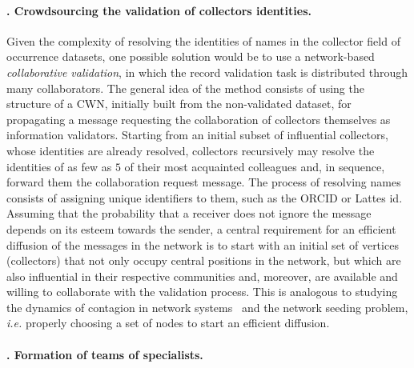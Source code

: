 \paragraph*{\theApplicationCase. Crowdsourcing the validation of collectors identities.}
Given the complexity of resolving the identities of names in the collector field of occurrence datasets, one possible solution would be to use a network-based \textit{collaborative validation}, in which the record validation task is distributed through many collaborators.
The general idea of the method consists of using the structure of a CWN, initially built from the non-validated dataset, for propagating a message requesting the collaboration of collectors themselves as information validators.
Starting from an initial subset of influential collectors, whose identities are already resolved, collectors recursively may resolve the identities of as few as $5$ of their most acquainted colleagues and, in sequence, forward them the collaboration request message. %
The process of resolving names consists of assigning unique identifiers to them, such as the ORCID or Lattes id.
Assuming that the probability that a receiver does not ignore the message depends on its esteem towards the sender, a central requirement for an efficient diffusion of the messages in the network is to start with an initial set of vertices (collectors) that not only occupy central positions in the network, but which are also influential in their respective communities and, moreover, are available and willing to collaborate with the validation process.
This is analogous to studying the dynamics of contagion in network systems~\cite{Gibson2005} and the network seeding problem, \textit{i.e.} properly choosing a set of nodes to start an efficient diffusion. 

\paragraph*{\theApplicationCase. Formation of teams of specialists.}

